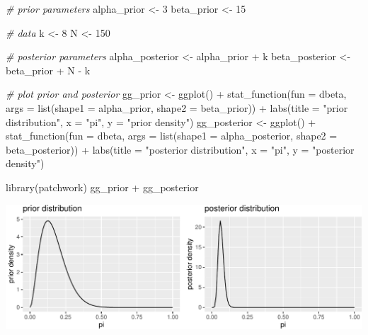 \documentclass[
]{book}
\newenvironment{Shaded}{\begin{snugshade}}{\end{snugshade}}
\newcommand{\AttributeTok}[1]{\textcolor[rgb]{0.77,0.63,0.00}{#1}}
\newcommand{\CommentTok}[1]{\textcolor[rgb]{0.56,0.35,0.01}{\textit{#1}}}
\newcommand{\DecValTok}[1]{\textcolor[rgb]{0.00,0.00,0.81}{#1}}
\newcommand{\FunctionTok}[1]{\textcolor[rgb]{0.00,0.00,0.00}{#1}}
\newcommand{\NormalTok}[1]{#1}
\newcommand{\OtherTok}[1]{\textcolor[rgb]{0.56,0.35,0.01}{#1}}
\newcommand{\SpecialCharTok}[1]{\textcolor[rgb]{0.00,0.00,0.00}{#1}}
\newcommand{\StringTok}[1]{\textcolor[rgb]{0.31,0.60,0.02}{#1}}
\begin{document}
\begin{Shaded}
\begin{Highlighting}[]
\CommentTok{\# prior parameters}
\NormalTok{alpha\_prior }\OtherTok{\textless{}{-}} \DecValTok{3}
\NormalTok{beta\_prior }\OtherTok{\textless{}{-}} \DecValTok{15}

\CommentTok{\# data }
\NormalTok{k }\OtherTok{\textless{}{-}} \DecValTok{8}
\NormalTok{N }\OtherTok{\textless{}{-}} \DecValTok{150}

\CommentTok{\# posterior parameters}
\NormalTok{alpha\_posterior }\OtherTok{\textless{}{-}}\NormalTok{ alpha\_prior }\SpecialCharTok{+}\NormalTok{ k}
\NormalTok{beta\_posterior }\OtherTok{\textless{}{-}}\NormalTok{ beta\_prior }\SpecialCharTok{+}\NormalTok{ N }\SpecialCharTok{{-}}\NormalTok{ k}

\CommentTok{\# plot prior and posterior}
\NormalTok{gg\_prior }\OtherTok{\textless{}{-}} \FunctionTok{ggplot}\NormalTok{() }\SpecialCharTok{+} 
  \FunctionTok{stat\_function}\NormalTok{(}\AttributeTok{fun =}\NormalTok{ dbeta, }\AttributeTok{args =} \FunctionTok{list}\NormalTok{(}\AttributeTok{shape1 =}\NormalTok{ alpha\_prior, }\AttributeTok{shape2 =}\NormalTok{ beta\_prior)) }\SpecialCharTok{+} 
  \FunctionTok{labs}\NormalTok{(}\AttributeTok{title =} \StringTok{"prior distribution"}\NormalTok{, }\AttributeTok{x =} \StringTok{"pi"}\NormalTok{, }\AttributeTok{y =} \StringTok{"prior density"}\NormalTok{)}
\NormalTok{gg\_posterior }\OtherTok{\textless{}{-}} \FunctionTok{ggplot}\NormalTok{() }\SpecialCharTok{+} 
  \FunctionTok{stat\_function}\NormalTok{(}\AttributeTok{fun =}\NormalTok{ dbeta, }\AttributeTok{args =} \FunctionTok{list}\NormalTok{(}\AttributeTok{shape1 =}\NormalTok{ alpha\_posterior, }\AttributeTok{shape2 =}\NormalTok{ beta\_posterior)) }\SpecialCharTok{+} 
  \FunctionTok{labs}\NormalTok{(}\AttributeTok{title =} \StringTok{"posterior distribution"}\NormalTok{, }\AttributeTok{x =} \StringTok{"pi"}\NormalTok{, }\AttributeTok{y =} \StringTok{"posterior density"}\NormalTok{)}

\FunctionTok{library}\NormalTok{(patchwork)}
\NormalTok{gg\_prior }\SpecialCharTok{+}\NormalTok{ gg\_posterior}
\end{Highlighting}
\end{Shaded}

\includegraphics{02-01-bayes_files/figure-latex/unnamed-chunk-4-1.pdf}
\end{document}
